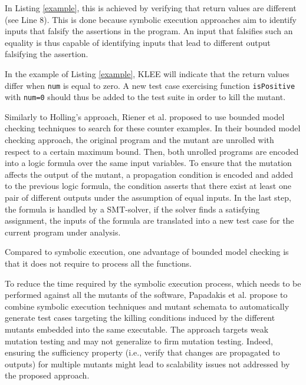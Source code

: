 In Listing \ref{example}, this is achieved by verifying that return values are different (see Line 8). 
This is done because symbolic execution approaches aim to identify inputs that falsify the assertions in the program. 
An input that falsifies such an equality is thus capable of identifying inputs that lead to different output falsifying the assertion.

In the example of Listing \ref{example}, KLEE will indicate that the return values differ when \texttt{num} is equal to zero.
A new test case exercising function \texttt{isPositive} with \texttt{num=0} should thus be added to the test suite in order to kill the mutant.



Similarly to Holling's approach, Riener et al. \cite{riener2011test} proposed to use bounded model checking techniques to search for these counter examples.
In their bounded model checking approach, the original program and the mutant are unrolled with respect to a certain maximum bound. Then, both unrolled programs are encoded into a logic formula over the same input variables. To ensure that the mutation affects the output of the mutant, a propagation condition is encoded and added to the previous logic formula, the condition asserts that there exist at least one pair of different outputs under the assumption of equal inputs. In the last step, the formula is handled by a SMT-solver, if the solver finds a satisfying assignment, the inputs of the formula are translated into a new test case for the current program under analysis.


Compared to symbolic execution, one advantage of bounded model checking is that it does not require to process all the functions.

To reduce the time required by the symbolic execution process, which needs to be performed against all the mutants of the software, Papadakis et al. \cite{papadakis2011automatically, papadakis2010towards} propose to combine symbolic execution techniques and mutant schemata to automatically generate test cases targeting the killing conditions induced by the different mutants embedded into the same executable. The approach targets weak mutation testing and may not generalize to firm mutation testing. Indeed, ensuring the sufficiency property (i.e., verify that changes are propagated to outputs) for multiple mutants might lead to scalability issues not addressed by the proposed approach.

